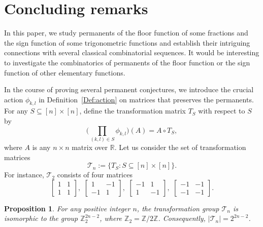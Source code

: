 \documentclass[11pt,reqno]{amsart}
\numberwithin{equation}{section}
\theoremstyle{plain}
\newtheorem{proposition}[theorem]{Proposition}
\theoremstyle{definition}
\newcommand{\Z}{\mathbb{Z}}
\begin{document}
\section{Concluding remarks}

In this paper, we study permanents of the floor function of some fractions and the sign function of some trigonometric functions and establish their intriguing connections with several classical combinatorial sequences. It would be interesting to investigate the combinatorics of permanents of the floor function or the sign function of other elementary functions.

In the course of proving several permanent conjectures, we introduce the crucial  action $\phi_{k,l}$ in Definition~\ref{Def:action} on matrices that preserves  the permanents. For any $S\subseteq[n]\times[n]$, define the transformation matrix $T_S$ with respect to $S$ by
$$
\biggl(\prod_{(k,l)\in S}\phi_{k,l}\biggr)(A)=A\circ T_S,
$$
where $A$ is any $n\times n$ matrix over  $\mathbb{R}$. Let us consider the set of  transformation matrices
$$\mathcal{T}_n:=\{T_S: S\subseteq[n]\times[n]\}.$$
For instance, $\mathcal{T}_2$ consists of four matrices
$$
\begin{bmatrix}
1 & 1 \\
1 & 1
\end{bmatrix},\,\,
\begin{bmatrix}
1 & -1 \\
-1 & 1
\end{bmatrix},\,\,
\begin{bmatrix}
-1 & 1 \\
1 & -1
\end{bmatrix},\,\,
\begin{bmatrix}
-1 & -1 \\
-1 & -1
\end{bmatrix}.
$$

\begin{proposition}\label{char-action}
For any positive integer $n$, the transformation group $\mathcal{T}_n$ is isomorphic to
the group $\Z_2^{2n-2}$, where $\Z_2=\Z/2\Z$. Consequently,
$|\mathcal{T}_n|=2^{2n-2}$.
\end{proposition}
\end{document}
